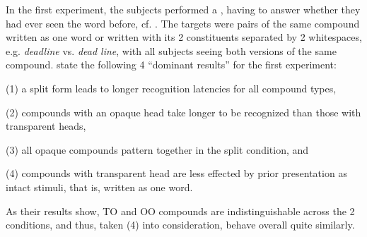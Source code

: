  In the first
experiment, the subjects performed a , having to
answer whether they had ever seen the word before,
cf. \citet[55]{Libbenetal:2003}. The targets were pairs of the same
compound written as one word or written with its 2 constituents
separated by 2 whitespaces, e.g. \emph{deadline}
vs. \emph{dead\hspace*{2ex}  line}, with all subjects seeing both
versions of the same compound. \citet[58]{Libbenetal:2003}
state the following 4 ``dominant results'' for the first
experiment:
\begin{inparaenum}
\item[(1)] a split form leads to longer recognition latencies for all compound types,
\item[(2)] compounds with an opaque head take longer to be recognized than those with
  transparent heads,
\item[(3)] all opaque compounds pattern together in the split condition, and
\item[(4)] compounds with transparent head are less effected by prior presentation
  as intact stimuli, that is, written as one word.
\end{inparaenum} As their results show,  
TO and OO compounds are indistinguishable across
the 2 conditions, and thus, taken (4) into consideration, behave overall quite
 similarly. 
\pagebreak[4]

